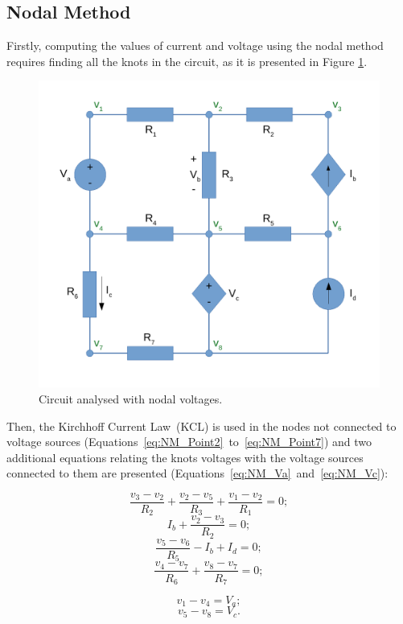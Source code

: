 \subsection{Nodal Method}

Firstly, computing the values of current and voltage using the nodal method requires finding all the knots in the circuit, as it is presented in Figure \ref{fig:Circuit_Nodal}.
\begin{figure}[h] \centering
\includegraphics[width=0.5\linewidth]{CircuitNodal.pdf}
\caption{Circuit analysed with nodal voltages.}
\label{fig:Circuit_Nodal}
\end{figure}

Then, the Kirchhoff Current Law~(KCL) is used in the nodes not connected to voltage sources (Equations~\ref{eq:NM_Point2}~to~\ref{eq:NM_Point7}) and two additional equations relating the knots voltages with the voltage sources connected to them are presented (Equations~\ref{eq:NM_Va}~and~\ref{eq:NM_Vc}):

\begin{equation}
  \frac{v_3-v_2}{R_2} + \frac{v_2-v_5}{R_3} + \frac{v_1-v_2}{R_1} = 0;
  \label{eq:NM_Point2}
\end{equation}
\begin{equation}
  I_b + \frac{v_2-v_3}{R_2} = 0;	
  \label{eq:NM_Point3}
\end{equation}
\begin{equation}
  \frac{v_5-v_6}{R_5} - I_b + I_d = 0;
  \label{eq:NM_Point6}
\end{equation}
\begin{equation}
  \frac{v_4-v_7}{R_6} + \frac{v_8-v_7}{R_7} = 0;
  \label{eq:NM_Point7}
\end{equation}

\begin{equation}
  v_1 - v_4 = V_a;
  \label{eq:NM_Va}
\end{equation}
\begin{equation}
  v_5 - v_8 = V_c.
  \label{eq:NM_Vc}
\end{equation}

